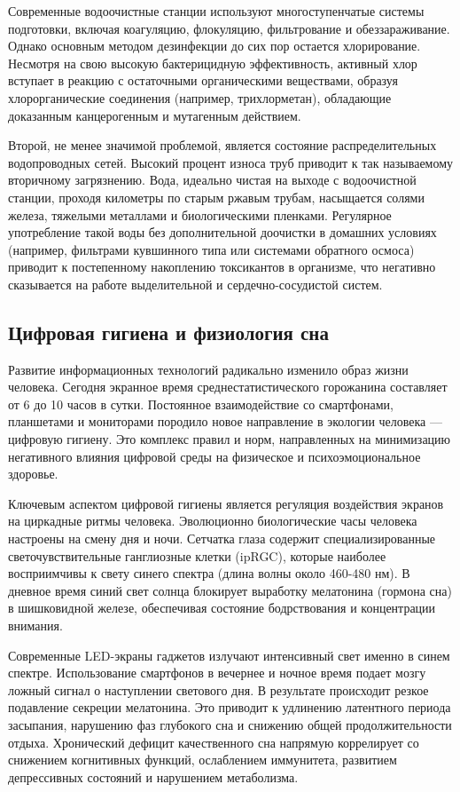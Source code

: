 Современные водоочистные станции используют многоступенчатые системы подготовки, включая коагуляцию, флокуляцию, фильтрование и обеззараживание. Однако основным методом дезинфекции до сих пор остается хлорирование. Несмотря на свою высокую бактерицидную эффективность, активный хлор вступает в реакцию с остаточными органическими веществами, образуя хлорорганические соединения (например, трихлорметан), обладающие доказанным канцерогенным и мутагенным действием. 

Второй, не менее значимой проблемой, является состояние распределительных водопроводных сетей. Высокий процент износа труб приводит к так называемому вторичному загрязнению. Вода, идеально чистая на выходе с водоочистной станции, проходя километры по старым ржавым трубам, насыщается солями железа, тяжелыми металлами и биологическими пленками. Регулярное употребление такой воды без дополнительной доочистки в домашних условиях (например, фильтрами кувшинного типа или системами обратного осмоса) приводит к постепенному накоплению токсикантов в организме, что негативно сказывается на работе выделительной и сердечно-сосудистой систем.

\subsection{Цифровая гигиена и физиология сна}
Развитие информационных технологий радикально изменило образ жизни человека. Сегодня экранное время среднестатистического горожанина составляет от 6 до 10 часов в сутки. Постоянное взаимодействие со смартфонами, планшетами и мониторами породило новое направление в экологии человека — цифровую гигиену. Это комплекс правил и норм, направленных на минимизацию негативного влияния цифровой среды на физическое и психоэмоциональное здоровье.

Ключевым аспектом цифровой гигиены является регуляция воздействия экранов на циркадные ритмы человека. Эволюционно биологические часы человека настроены на смену дня и ночи. Сетчатка глаза содержит специализированные светочувствительные ганглиозные клетки (ipRGC), которые наиболее восприимчивы к свету синего спектра (длина волны около 460-480 нм). В дневное время синий свет солнца блокирует выработку мелатонина (гормона сна) в шишковидной железе, обеспечивая состояние бодрствования и концентрации внимания.

Современные LED-экраны гаджетов излучают интенсивный свет именно в синем спектре. Использование смартфонов в вечернее и ночное время подает мозгу ложный сигнал о наступлении светового дня. В результате происходит резкое подавление секреции мелатонина. Это приводит к удлинению латентного периода засыпания, нарушению фаз глубокого сна и снижению общей продолжительности отдыха. Хронический дефицит качественного сна напрямую коррелирует со снижением когнитивных функций, ослаблением иммунитета, развитием депрессивных состояний и нарушением метаболизма.

